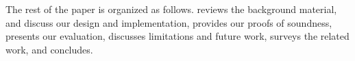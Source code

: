 The rest of the paper is organized as follows.
\sect{\ref{sec:overview}} reviews the background material, %
\sect{\ref{sec:design}} and \sect{\ref{sec:implementation}} discuss our design and implementation, %
\sect{\ref{sec:soundness}} provides our proofs of soundness, %
\sect{\ref{sec:eval}} presents our evaluation,
\sect{\ref{sec:future}} discusses limitations and future work,
\sect{\ref{sec:related}} surveys the related work,
and \sect{\ref{sec:conclusion}} concludes.
